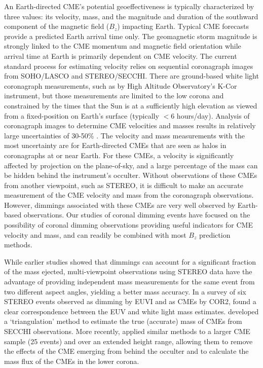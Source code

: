 An Earth-directed CME’s potential geoeffectiveness is typically characterized by three values: its velocity, mass, and the magnitude and duration of the southward component of the magnetic field ($B_z$) impacting Earth. Typical CME forecasts provide a predicted Earth arrival time only. The geomagnetic storm magnitude is strongly linked to the CME momentum and magnetic field orientation while arrival time at Earth is primarily dependent on CME velocity. The current standard process for estimating velocity relies on sequential coronagraph images from SOHO/LASCO and STEREO/SECCHI. There are ground-based white light coronagraph measurements, such as by High Altitude Observatory’s K-Cor instrument, but those measurements are limited to the low corona and constrained by the times that the Sun is at a sufficiently high elevation as viewed from a fixed-position on Earth’s surface (typically $<$6 hours/day). Analysis of coronagraph images to determine CME velocities and masses results in relatively large uncertainties of 30-50\% \citep{Vourlidas2000, Vourlidas2010, Vourlidas2011}. The velocity and mass measurements with the most uncertainty are for Earth-directed CMEs that are seen as halos in coronagraphs at or near Earth. For these CMEs, a velocity is significantly affected by projection on the plane-of-sky, and a large percentage of the mass can be hidden behind the instrument’s occulter. Without observations of these CMEs from another viewpoint, such as STEREO, it is difficult to make an accurate measurement of the CME velocity and mass from the coronagraph observations. However, dimmings associated with these CMEs are very well observed by Earth-based observations. Our studies of coronal dimming events have focused on the possibility of coronal dimming observations providing useful indicators for CME velocity and mass, and can readily be combined with most $B_z$ prediction methods.

While earlier studies showed that dimmings can account for a significant fraction of the mass ejected, multi-viewpoint observations using STEREO data have the advantage of providing independent mass measurements for the same event from two different aspect angles, yielding a better mass accuracy. In a survey of six STEREO events observed as dimming by EUVI and as CMEs by COR2, \citet{Aschwanden2009} found a clear correspondence between the EUV and white light mass estimates. \citet{Colaninno2009} developed a ‘triangulation’ method to estimate the true (accurate) mass of CMEs from SECCHI observations. More recently, \citet{Bein2013} applied similar methods to a larger CME sample (25 events) and over an extended height range, allowing them to remove the effects of the CME emerging from behind the occulter and to calculate the mass flux of the CMEs in the lower corona.

